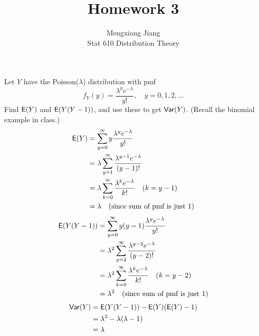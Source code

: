 \documentclass[12pt]{article}
\newcommand{\E}{{\sf E}}
\newcommand{\Var}{{\sf Var}}
\newenvironment{problem}[2][Problem]{\begin{trivlist}
\item[\hskip \labelsep {\bfseries #1}\hskip \labelsep {\bfseries #2.}]}
{\end{trivlist}}
\begin{document}
 
 
\title{Homework 3}%
\author{Mengxiang Jiang\\ %
Stat 610 Distribution Theory} %
 
\maketitle

\begin{problem}{1}
  Let $Y$ have the Poisson($\lambda$) distribution with pmf
  \[
    f_Y(y) = \frac{\lambda^ye^{-\lambda}}{y!}, \quad y = 0, 1, 2, \ldots
  \]
  Find $\E(Y)$ and $\E(Y(Y-1))$, and use these to get $\Var(Y)$.
  (Recall the binomial example in class.)
  \[
    \begin{aligned}
      \E(Y) &= \sum_{y=0}^{\infty} y \frac{\lambda^y e^{-\lambda}}{y!} \\
      &= \lambda \sum_{y=1}^{\infty} \frac{\lambda^{y-1}e^{-\lambda}}{(y-1)!} \\
      &= \lambda \sum_{k=0}^{\infty} \frac{\lambda^k e^{-\lambda}}{k!} 
      \quad (k = y-1) \\
      &= \lambda \quad (\text{since sum of pmf is just 1})
    \end{aligned}
  \]
  \[
    \begin{aligned}
      \E(Y(Y-1)) &= \sum_{y=0}^{\infty} y(y-1) \frac{\lambda^y e^{-\lambda}}{y!} \\
      &= \lambda^2 \sum_{y=2}^{\infty} \frac{\lambda^{y-2} e^{-\lambda}}{(y-2)!} \\
      &= \lambda^2 \sum_{k=0}^{\infty} \frac{\lambda^k e^{-\lambda}}{k!}
      \quad (k = y-2) \\
      &= \lambda^2 \quad (\text{since sum of pmf is just 1})
    \end{aligned}
  \]
  \[
    \begin{aligned}
      \Var(Y) &= \E(Y(Y-1)) - \E(Y)(\E(Y)-1) \\
      &= \lambda^2 - \lambda(\lambda - 1) \\
      &= \lambda
    \end{aligned}
  \]
\end{problem}

\pagebreak
\end{document}
